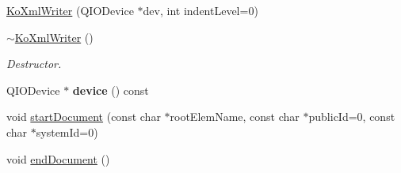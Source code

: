 \begin{DoxyCompactItemize}
\item 
\hyperlink{classKoXmlWriter_a533f9617e577fd34b4a4c7ad9fe23255}{KoXmlWriter} (QIODevice $\ast$dev, int indentLevel=0)
\item 
\hypertarget{classKoXmlWriter_a0af2dc9077618677116a0fe22b6f8951}{
\hyperlink{classKoXmlWriter_a0af2dc9077618677116a0fe22b6f8951}{$\sim$KoXmlWriter} ()}
\label{classKoXmlWriter_a0af2dc9077618677116a0fe22b6f8951}

\begin{DoxyCompactList}\small\item\em Destructor. \item\end{DoxyCompactList}\item 
\hypertarget{classKoXmlWriter_a43b736aa4bfa08765e0648d6fb5758ed}{
QIODevice $\ast$ {\bfseries device} () const }
\label{classKoXmlWriter_a43b736aa4bfa08765e0648d6fb5758ed}

\item 
void \hyperlink{classKoXmlWriter_a867932c8d3bbecd712572230cb0b64cd}{startDocument} (const char $\ast$rootElemName, const char $\ast$publicId=0, const char $\ast$systemId=0)
\item 
\hypertarget{classKoXmlWriter_a5ab08b557107287ecc4e1f6528a79843}{
void \hyperlink{classKoXmlWriter_a5ab08b557107287ecc4e1f6528a79843}{endDocument} ()}
\label{classKoXmlWriter_a5ab08b557107287ecc4e1f6528a79843}


\end{DoxyCompactItemize}
